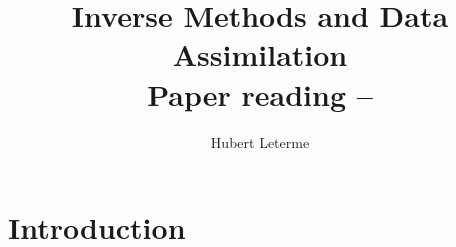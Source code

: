 \documentclass[a4paper,10pt]{article}
\title{Inverse Methods and Data Assimilation\\Paper reading -- \cite{lawless2008}}
\author{Hubert Leterme}
\begin{document}
\maketitle

\section{Introduction}



\end{document}
